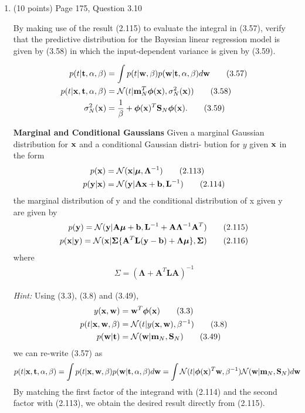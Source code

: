 \documentclass[11pt]{article}
\begin{document}
\begin{enumerate}
\item (10 points) Page 175, Question 3.10

\begin{framed}
By making use of the result (2.115) to evaluate the integral in (3.57), verify that the predictive distribution for the Bayesian linear regression model is given by (3.58) in which the input-dependent variance is given by (3.59).
{%
\begin{align*}
p(t|\mathbf{t}, \alpha, \beta) 
&= \int p(t| \mathbf{w}, \beta) p(\mathbf{w} | \mathbf{t}, \alpha, \beta) d \mathbf{w}
\tag{3.57}\\
p(t| \mathbf{x}, \mathbf{t}, \alpha, \beta) &= \mathcal N (t | \mathbf{m}_N^T \bm{\phi}(\mathbf{x}), \sigma_N^2(\mathbf{x}))
\tag{3.58}\\
\sigma_N^2 (\mathbf{x}) &= \frac{1}{\beta} + \bm{\phi}(\mathbf{x})^T \mathbf{S}_N \bm{\phi}(\mathbf{x}). 
\tag{3.59}
\end{align*}

\noindent\textbf{Marginal and Conditional Gaussians}
Given a marginal Gaussian distribution for $\mathbf{x}$ and a conditional Gaussian distri- bution for $y$ given $\mathbf{x}$ in the form
\begin{align*}
p(\mathbf{x})             &= \mathcal N (\mathbf{x} | \bm{\mu}, \bm \Lambda^{-1}) \tag{2.113}\\
p(\mathbf y | \mathbf{x}) &= \mathcal N (\mathbf{y} | \mathbf A \mathbf{x} + \mathbf b, \mathbf L^{-1}) \tag{2.114}
\end{align*}
the marginal distribution of y and the conditional distribution of x given y are given by
\begin{align*}
p(\mathbf{y}) = \mathcal N(\mathbf{y} | \mathbf A \bm \mu + \mathbf b, 
      \mathbf L^{-1} + \mathbf A \bm \Lambda^{-1} \mathbf A^T)\tag{2.115}\\
p(\mathbf{x}| \mathbf{y}) = \mathcal N (\mathbf{x} | \bm \Sigma \{  \mathbf A^T \mathbf L (\mathbf{y} - \mathbf b) + \bm \Lambda \bm \mu\}, \bm \Sigma)
\tag{2.116}
\end{align*}
where 
\begin{align*}
\Sigma = (\bm \Lambda + \mathbf A^T \mathbf L \mathbf A)^{-1} \tag{2.117}
\end{align*}}
\end{framed}


\textit{Hint:} Using (3.3), (3.8) and (3.49), 
{%
\begin{align*}
y(\mathbf{x}, \mathbf{w}) &= \mathbf{w}^T \bm{\phi}(\mathbf{x}) \tag{3.3}\\
p(t|\mathbf{x}, \mathbf{w}, \beta) &= \mathcal N (t|y(\mathbf{x}, \mathbf{w}), \beta^{-1}) \tag{3.8}\\
p(\mathbf{w} | \mathbf{t}) &= \mathcal N(\mathbf{w} | \mathbf{m}_N, \mathbf{S}_N) \tag{3.49}
\end{align*}}
we can re-write (3.57) as
\begin{align*}
p(t|\mathbf{x}, \mathbf{t}, \alpha, \beta) 
&= \int p(t| \mathbf{x}, \mathbf{w}, \beta) p(\mathbf{w} | \mathbf{t}, \alpha, \beta) d \mathbf{w}
= \int \mathcal N (t | \bm{\phi}(\mathbf{x})^T \mathbf{w}, \beta^{-1}) 
\mathcal N (\mathbf{w} | \mathbf{m}_N, \mathbf{S}_N) d \mathbf{w} 
\end{align*}
By matching the first factor of the integrand with (2.114) and the second factor with (2.113), we obtain the desired result directly from (2.115).



\end{enumerate}
\end{document}
